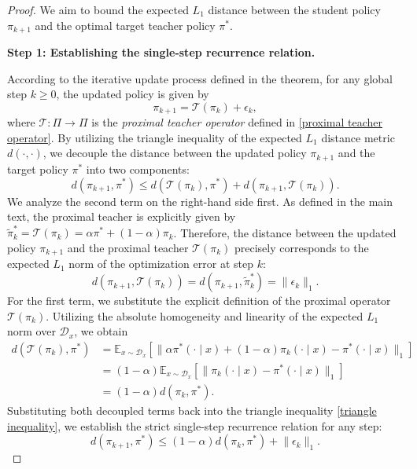 \documentclass{article}
\theoremstyle{plain}
\theoremstyle{definition}
\theoremstyle{remark}
\begin{document}
\begin{proof}
	We aim to bound the expected $L_1$ distance between the student policy $\pi_{k+1}$ and the optimal target teacher policy $\pi^*$.
	
	\textbf{Step 1: Establishing the single-step recurrence relation.}
	
	According to the iterative update process defined in the theorem, for any global step $k \geq 0$, the updated policy is given by
	\begin{equation}
		\pi_{k+1} = \mathcal{T}(\pi_k) + \epsilon_k,
	\end{equation}
	where $\mathcal{T}:\Pi\to\Pi$ is the \textit{proximal teacher operator} defined in \eqref{proximal teacher operator}. By utilizing the triangle inequality of the expected $L_1$ distance metric $d(\cdot, \cdot)$, we decouple the distance between the updated policy $\pi_{k+1}$ and the target policy $\pi^*$ into two components:
	\begin{equation}\label{triangle inequality}
		d(\pi_{k+1}, \pi^*) \leq d(\mathcal{T}(\pi_k), \pi^*) + d(\pi_{k+1}, \mathcal{T}(\pi_k)).
	\end{equation}
	We analyze the second term on the right-hand side first. As defined in the main text, the proximal teacher is explicitly given by $\tilde{\pi}_k^*=\mathcal{T}(\pi_k)=\alpha\pi^*+(1-\alpha)\pi_k$. Therefore, the distance between the updated policy $\pi_{k+1}$ and the proximal teacher $\mathcal{T}(\pi_k)$ precisely corresponds to the expected $L_1$ norm of the optimization error at step $k$:
	\begin{equation}
		d(\pi_{k+1}, \mathcal{T}(\pi_k)) = d(\pi_{k+1}, \tilde{\pi}_k^*) = \lVert\epsilon_k\rVert_1.
	\end{equation}
	For the first term, we substitute the explicit definition of the proximal operator $\mathcal{T}(\pi_k)$. Utilizing the absolute homogeneity and linearity of the expected $L_1$ norm over $\mathcal{D}_x$, we obtain
	\begin{equation}
		\begin{split}
			d(\mathcal{T}(\pi_k), \pi^*)&=\mathbb{E}_{x\sim\mathcal{D}_x}\left[\lVert\alpha\pi^*(\cdot\mid x)+(1-\alpha)\pi_k(\cdot\mid x)-\pi^*(\cdot\mid x)\rVert_1\right]\\
			&=(1-\alpha)\mathbb{E}_{x\sim\mathcal{D}_x}\left[\lVert\pi_k(\cdot\mid x)-\pi^*(\cdot\mid x)\rVert_1\right]\\
			&=(1-\alpha)d(\pi_k,\pi^*).
		\end{split}
	\end{equation}
	Substituting both decoupled terms back into the triangle inequality \eqref{triangle inequality}, we establish the strict single-step recurrence relation for any step:
	\begin{equation}
		d(\pi_{k+1}, \pi^*) \leq(1-\alpha)d(\pi_k,\pi^*)+\lVert\epsilon_k\rVert_1.
	\end{equation}
	

\end{proof}
\end{document}
